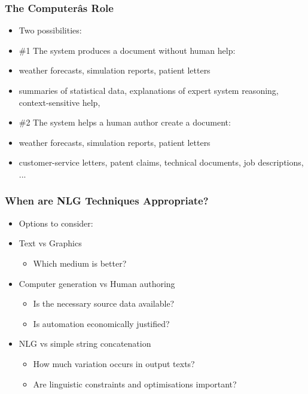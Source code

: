 \documentclass[compress,color=usenames]{beamer}
\begin{document}
\begin{frame}
\frametitle{The Computer\^as Role}

\label{f42}
\begin{itemize}
\item { {Two possibilities:}}
\item { {\#1 The system produces a document without human help: }}
\item { {weather forecasts, simulation reports, patient letters}}
\item { {summaries of statistical data, explanations of expert system reasoning, context-sensitive help, }}
\item { {\#2 The system helps a human author create a document:}}
\item { {weather forecasts, simulation reports, patient letters}}
\item { {customer-service letters, patent claims, technical documents, job descriptions, ...}}
\end{itemize}

\end{frame}

\begin{frame}
\frametitle{When are NLG Techniques Appropriate?}

\label{f44}
\begin{itemize}
\item { {Options to consider:}}
\item { {Text vs Graphics}}
\begin{itemize}
\item Which medium is better?
\end{itemize}
\item { {Computer generation vs Human authoring}}
\begin{itemize}
\item Is the necessary source data available?
\item Is automation economically justified?
\end{itemize}
\item { {NLG vs simple string concatenation}}
\begin{itemize}
\item How much variation occurs in output texts?
\item Are linguistic constraints and optimisations important?
\end{itemize}
\end{itemize}

\end{frame}
\end{document}
